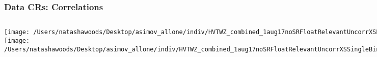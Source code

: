 \documentclass{beamer}
\begin{document}
\begin{frame}
\frametitle{Data CRs: Correlations}
    \begin{columns}[t]
     \texttt{[image: /Users/natashawoods/Desktop/asimov\_allone/indiv/HVTWZ\_combined\_1aug17noSRFloatRelevantUncorrXSPrunSyst/corr\_doAsimov0\_doCondtional1\_mu0\_HighCorr.pdf]}
      \texttt{[image: /Users/natashawoods/Desktop/asimov\_allone/indiv/HVTWZ\_combined\_1aug17noSRFloatRelevantUncorrXSSingleBinPrunSyst/corr\_doAsimov0\_doCondtional1\_mu0\_HighCorr.pdf]}
\end{columns}
\end{frame}
\end{document}
